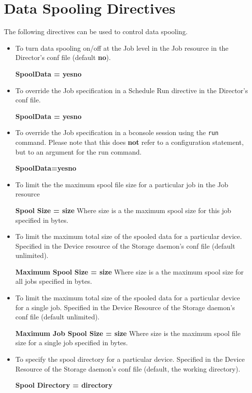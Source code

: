 \label{directives}
\section{Data Spooling Directives}

The following directives can be used to control data spooling. 

\begin{itemize}
\item To turn data spooling on/off at the Job level in  the Job resource in
   the Director's conf file (default  {\bf no}).

{\bf SpoolData = yes\vb{}no} 

\item To override the Job specification in a Schedule Run  directive in the
   Director's conf file.

{\bf SpoolData = yes\vb{}no} 

\item To override the Job specification in a bconsole session using the \texttt{run}
   command. Please note that this does {\bf not } refer to a configuration
   statement, but to an argument for the run command.

{\bf SpoolData=yes\vb{}no} 

\item To limit the the maximum spool file size for a particular job in the Job
  resource

{\bf Spool Size = size}
   Where size is a the maximum spool size for this job  specified in bytes. 

\item To limit the maximum total size of the spooled data  for a particular
   device. Specified in the Device  resource of the Storage daemon's conf file
   (default  unlimited).

{\bf Maximum Spool Size = size}
   Where size is a the maximum spool size for all jobs  specified in bytes. 

\item To limit the maximum total size of the spooled data  for a particular
   device for a single job. Specified  in the Device Resource of the Storage
   daemon's conf  file (default unlimited).

{\bf Maximum Job Spool Size = size}
   Where size is the maximum spool file size for a single  job specified in
   bytes. 

\item To specify the spool directory for a particular device.  Specified in
   the Device Resource of the Storage daemon's conf  file (default, the working
   directory).

{\bf Spool Directory = directory} 
\end{itemize}

